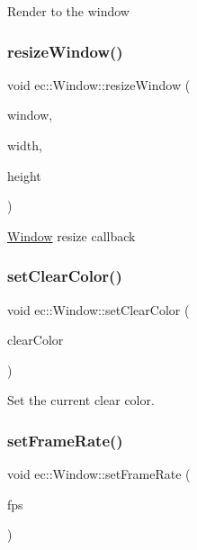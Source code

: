 Render to the window \mbox{\label{classec_1_1_window_a33ef071f4198715ae42844c681fb40eb}} 
\subsubsection{\texorpdfstring{resize\+Window()}{resizeWindow()}}
{\footnotesize\ttfamily void ec\+::\+Window\+::resize\+Window (\begin{DoxyParamCaption}\item[{G\+L\+F\+Wwindow $\ast$}]{window,  }\item[{int}]{width,  }\item[{int}]{height }\end{DoxyParamCaption})\hspace{0.3cm}{\ttfamily [virtual]}}

\mbox{\hyperlink{classec_1_1_window}{Window}} resize callback \mbox{\label{classec_1_1_window_a915c4b64dde5f2274e59c40bc10eff58}} 
\subsubsection{\texorpdfstring{set\+Clear\+Color()}{setClearColor()}}
{\footnotesize\ttfamily void ec\+::\+Window\+::set\+Clear\+Color (\begin{DoxyParamCaption}\item[{const glm\+::vec4 \&}]{clear\+Color }\end{DoxyParamCaption})}

Set the current clear color. \mbox{\label{classec_1_1_window_a6acc36f2c069b5e38f522953ca52ce9f}} 
\subsubsection{\texorpdfstring{set\+Frame\+Rate()}{setFrameRate()}}
{\footnotesize\ttfamily void ec\+::\+Window\+::set\+Frame\+Rate (\begin{DoxyParamCaption}\item[{double}]{fps }\end{DoxyParamCaption})\hspace{0.3cm}{\ttfamily [virtual]}}

